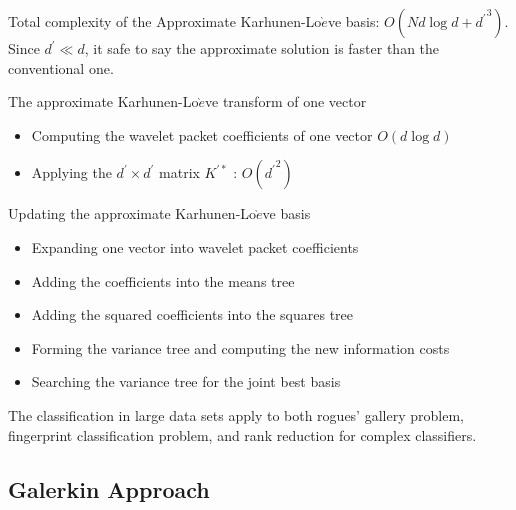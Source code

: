 \documentclass[11pt]{article}
\begin{document}
Total complexity of the Approximate Karhunen-Lo$\grave{e}$ve basis: $O(Nd\log d + {d^\prime}^3)$.  Since $d^\prime \ll d$, it safe to say the approximate solution is faster than the conventional one. 

The approximate Karhunen-Lo$\grave{e}$ve transform of one vector 
\begin{itemize}
\item Computing the wavelet packet coefficients of one vector $O(d \log d)$
\item Applying the $d^\prime \times d^\prime$ matrix $K^{\prime \ast}$ : $O({d^\prime}^2)$
\end{itemize}

Updating the approximate Karhunen-Lo$\grave{e}$ve basis 
\begin{itemize}
\item Expanding one vector into wavelet packet coefficients 
\item Adding the coefficients into the means tree
\item Adding the squared coefficients into the squares tree
\item Forming the variance tree and computing the new information costs
\item Searching the variance tree for the joint best basis
\end{itemize}

The classification in large data sets apply to both rogues' gallery problem, fingerprint classification problem, and rank reduction for complex classifiers.  

\subsection {Galerkin Approach}

\subsection{}
\end{document}
